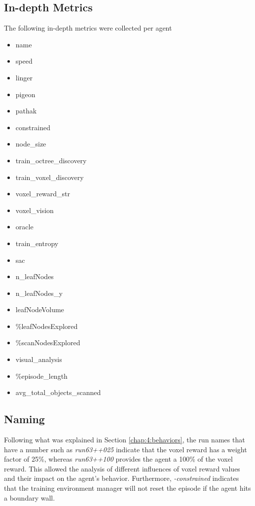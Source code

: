         

\newpage
\subsection{In-depth Metrics}\label{appendix:indepth-metrics}
The following in-depth metrics were collected per agent

    \begin{multicols}{3}
\begin{itemize}
    \item name
    \item speed
    \item linger
    \item pigeon
    \item pathak
    \item constrained
    \item node\_size
    \item train\_octree\_discovery
    \item train\_voxel\_discovery
    \item voxel\_reward\_str
    \item voxel\_vision
    \item oracle
    \item train\_entropy
    \item sac
    \item n\_leafNodes
    \item n\_leafNodes\_y
    \item leafNodeVolume
    \item \%leafNodesExplored
    \item \%scanNodesExplored
    \item visual\_analysis %
    \item \%episode\_length
    \item avg\_total\_objects\_scanned
\end{itemize}
\end{multicols}


\subsection{Naming}

Following what was explained in Section \ref{chap:4:behaviors}, the run names that have a number such as \textit{run63++025} indicate that the voxel reward has a weight factor of 25\%, whereas \textit{run63++100} provides the agent a 100\% of the voxel reward. This allowed the analysis of different influences of voxel reward values and their impact on the agent's behavior. Furthermore, \textit{-constrained} indicates that the training environment manager will not reset the episode if the agent hits a boundary wall.

